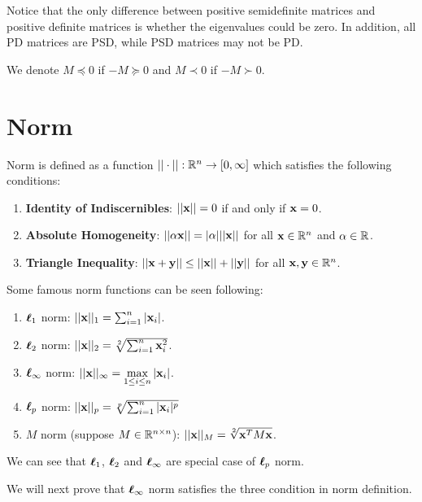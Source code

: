 \documentclass[main.tex]{subfiles}
\begin{document}
Notice that the only difference between positive semidefinite matrices and positive definite matrices is whether the eigenvalues could be zero. In addition, all PD matrices are PSD, while PSD matrices may not be PD.

\begin{notation}
	We denote $M \preceq 0$ if $-M \succeq 0$ and $M \prec 0$ if $-M \succ 0$.
\end{notation}


\section{Norm}

\begin{definition}
	Norm is defined as a function $||\cdot||: \mathbb{R}^n \to [0, \infty]$ which satisfies the following conditions:
	
	\begin{enumerate}
		\item \textbf{Identity of Indiscernibles}: $||\mathbf{x}|| = 0$ if and only if $\mathbf{x} = 0$.
		\item \textbf{Absolute Homogeneity}: $||\alpha \mathbf{x}|| = |\alpha| ||\mathbf{x}||$ for all $\mathbf{x} \in \mathbb{R}^n$ and $\alpha \in \mathbb{R}$.
		\item \textbf{Triangle Inequality}: $||\mathbf{x} + \mathbf{y}|| \leq ||\mathbf{x}|| + ||\mathbf{y}||$ for all $\mathbf{x}, \mathbf{y} \in \mathbb{R}^n$.  
	\end{enumerate} 
\end{definition}

Some famous norm functions can be seen following:

\begin{enumerate}
	\item $\boldsymbol{\ell}_1$ norm: $||\mathbf{x}||_1 = \sum_{i=1}^{n} |\mathbf{x}_i|$.
	\item $\boldsymbol{\ell}_2$ norm: $||\mathbf{x}||_2 = \sqrt[2]{\sum_{i=1}^n \mathbf{x}_i^2}$.
	\item $\boldsymbol{\ell}_{\infty}$ norm: $||\mathbf{x}||_{\infty} = \max\limits_{1 \leq i \leq n} |\mathbf{x}_i|$.
	\item $\boldsymbol{\ell}_p$ norm: $||\mathbf{x}||_p = \sqrt[p]{\sum_{i=1}^n |\mathbf{x}_i|^p}$
	\item $M$ norm (suppose $M \in \mathbb{R}^{n\times n}$): $||\mathbf{x}||_M = \sqrt[2]{\mathbf{x}^T M \mathbf{x}}$.
\end{enumerate}

We can see that $\boldsymbol{\ell}_1$, $\boldsymbol{\ell}_2$ and $\boldsymbol{\ell}_{\infty}$ are special case of $\boldsymbol{\ell}_p$ norm.

We will next prove that $\boldsymbol{\ell}_{\infty}$ norm satisfies the three condition in norm definition.
\end{document}
